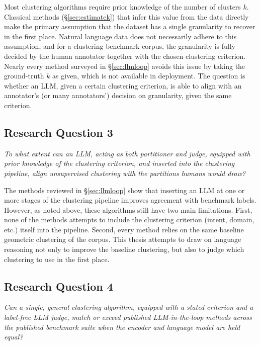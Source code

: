 \documentclass[11pt,a4paper,oneside]{report}
\begin{document}
Most clustering algorithms require prior knowledge of the number of clusters $k$. Classical methods (\S\ref{sec:estimatek}) that infer this value from the data directly make the primary assumption that the dataset has a single granularity to recover in the first place. Natural language data does not necessarily adhere to this assumption, and for a clustering benchmark corpus, the granularity is fully decided by the human annotator together with the chosen clustering criterion. Nearly every method surveyed in \S\ref{sec:llmloop} avoids this issue by taking the ground-truth $k$ as given, which is not available in deployment. The question is whether an LLM, given a certain clustering criterion, is able to align with an annotator's (or many annotators') decision on granularity, given the same criterion.

\subsection{Research Question 3}

\emph{To what extent can an LLM, acting as both partitioner and judge, equipped with prior knowledge of the clustering criterion, and inserted into the clustering pipeline, align unsupervised clustering with the partitions humans would draw?}

\vspace{\baselineskip}

The methods reviewed in \S\ref{sec:llmloop} show that inserting an LLM at one or more stages of the clustering pipeline improves agreement with benchmark labels. However, as noted above, these algorithms still have two main limitations. First, none of the methods attempts to include the clustering criterion (intent, domain, etc.) itself into the pipeline. Second, every method relies on the same baseline geometric clustering of the corpus. This thesis attempts to draw on language reasoning not only to improve the baseline clustering, but also to judge which clustering to use in the first place.

\subsection{Research Question 4}

\emph{Can a single, general clustering algorithm, equipped with a stated criterion and a label-free LLM judge, match or exceed published LLM-in-the-loop methods across the published benchmark suite when the encoder and language model are held equal?}
\end{document}
